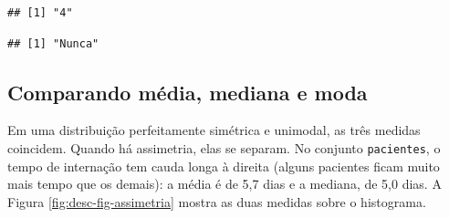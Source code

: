 \documentclass[
]{book}
\newenvironment{Shaded}{\begin{snugshade}}{\end{snugshade}}
\newcommand{\AttributeTok}[1]{\textcolor[rgb]{0.13,0.29,0.53}{#1}}
\newcommand{\DecValTok}[1]{\textcolor[rgb]{0.00,0.00,0.81}{#1}}
\newcommand{\FloatTok}[1]{\textcolor[rgb]{0.00,0.00,0.81}{#1}}
\newcommand{\FunctionTok}[1]{\textcolor[rgb]{0.13,0.29,0.53}{\textbf{#1}}}
\newcommand{\NormalTok}[1]{#1}
\newcommand{\SpecialCharTok}[1]{\textcolor[rgb]{0.81,0.36,0.00}{\textbf{#1}}}
\newcommand{\StringTok}[1]{\textcolor[rgb]{0.31,0.60,0.02}{#1}}
\begin{document}
\begin{verbatim}
## [1] "4"
\end{verbatim}

\begin{Shaded}
\end{Shaded}

\begin{verbatim}
## [1] "Nunca"
\end{verbatim}

\subsection{Comparando média, mediana e moda}\label{comparando-muxe9dia-mediana-e-moda}

Em uma distribuição perfeitamente simétrica e unimodal, as três medidas coincidem. Quando há assimetria, elas se separam. No conjunto \texttt{pacientes}, o tempo de internação tem cauda longa à direita (alguns pacientes ficam muito mais tempo que os demais): a média é de 5,7 dias e a mediana, de 5,0 dias. A Figura \ref{fig:desc-fig-assimetria} mostra as duas medidas sobre o histograma.

\begin{Shaded}
\end{Shaded}
\end{document}
